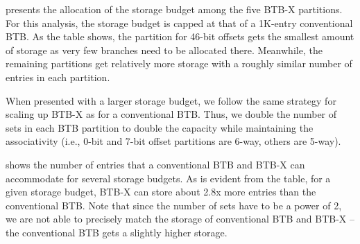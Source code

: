 
 presents the allocation of the storage budget among the five BTB-X partitions. For this analysis, the storage budget is capped at that of a 1K-entry conventional BTB. As the table shows, the partition for 46-bit offsets gets the smallest amount of storage as very few branches need to be allocated there. Meanwhile, the remaining partitions get relatively more storage with a roughly similar number of entries in each partition. 

When presented with a larger storage budget, we follow the same strategy for scaling up BTB-X as for a conventional BTB. Thus, we double the number of sets in each BTB partition to double the capacity while maintaining the associativity (i.e., 0-bit and 7-bit offset partitions are 6-way, others are 5-way).

 shows the number of entries that a conventional BTB and BTB-X can accommodate for several storage budgets. As is evident from the table, for a given storage budget, BTB-X can store about 2.8x more entries than the conventional BTB. Note that since the number of sets have to be a power of 2, we are not able to precisely match the storage of conventional BTB and BTB-X -- the conventional BTB gets a slightly higher storage.

